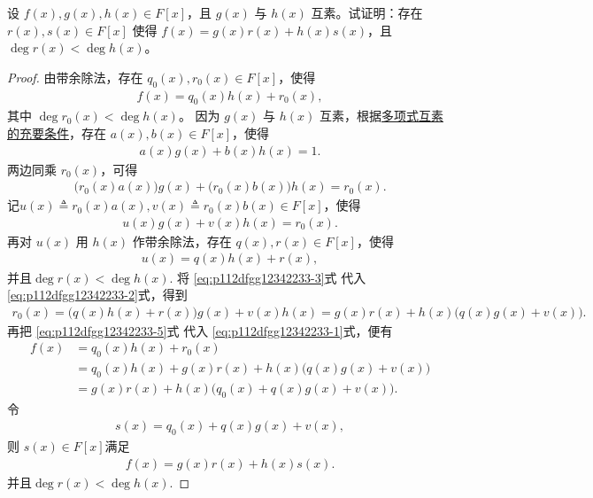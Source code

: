 \documentclass[../../main.tex]{subfiles}%
\begin{document}
\begin{example}
设 \(f(x),g(x),h(x)\in F[x]\)，且 \(g(x)\) 与 \(h(x)\) 互素。试证明：存在 \(r(x),s(x)\in F[x]\) 使得 \(f(x) = g(x)r(x) + h(x)s(x)\)，且 \(\deg r(x)< \deg h(x)\)。
\end{example}
\begin{proof}
由带余除法，存在 \(q_{0}(x),r_{0}(x)\in F[x]\)，使得
\begin{align}
f(x) = q_{0}(x)h(x) + r_{0}(x), \label{eq:p112dfgg12342233-1}
\end{align}
其中 \(\deg r_{0}(x)< \deg h(x)\)。
因为 \(g(x)\) 与 \(h(x)\) 互素，根据\hyperref[theorem:多项式互素的充要条件]{多项式互素的充要条件}，存在 \(a(x),b(x)\in F[x]\)，使得
\begin{align*}
a(x)g(x) + b(x)h(x) = 1.
\end{align*}
两边同乘 \(r_{0}(x)\)，可得
\begin{align*}
\bigl(r_{0}(x)a(x)\bigr)g(x) + \bigl(r_{0}(x)b(x)\bigr)h(x) = r_{0}(x).
\end{align*}
记\(u(x)\triangleq r_0(x)a(x),v(x)\triangleq r_0(x)b(x)\in F[x]\)，使得
\begin{align}
u(x)g(x) + v(x)h(x) = r_{0}(x). \label{eq:p112dfgg12342233-2}
\end{align}
再对 \(u(x)\) 用 \(h(x)\) 作带余除法，存在 \(q(x),r(x)\in F[x]\)，使得
\begin{align}
u(x) = q(x)h(x) + r(x), \label{eq:p112dfgg12342233-3}
\end{align}
并且$\deg r(x)< \deg h(x).$
将 \eqref{eq:p112dfgg12342233-3}式 代入 \eqref{eq:p112dfgg12342233-2}式，得到
\begin{align}
r_{0}(x)  = \bigl(q(x)h(x) + r(x)\bigr)g(x) + v(x)h(x) = g(x)r(x) + h(x)\bigl(q(x)g(x) + v(x)\bigr). \label{eq:p112dfgg12342233-5}
\end{align}
再把 \eqref{eq:p112dfgg12342233-5}式 代入 \eqref{eq:p112dfgg12342233-1}式，便有
\begin{align*}
f(x) & = q_{0}(x)h(x) + r_{0}(x) \\
& = q_{0}(x)h(x) + g(x)r(x) + h(x)\bigl(q(x)g(x) + v(x)\bigr) \\
& = g(x)r(x) + h(x)\bigl(q_{0}(x) + q(x)g(x) + v(x)\bigr).
\end{align*}
令
\begin{align*}
s(x) = q_{0}(x) + q(x)g(x) + v(x),
\end{align*}
则 \(s(x)\in F[x]\)满足
\begin{align*}
f(x) = g(x)r(x) + h(x)s(x).
\end{align*}
并且$\deg r(x)< \deg h(x).$\end{proof}
\end{document}
